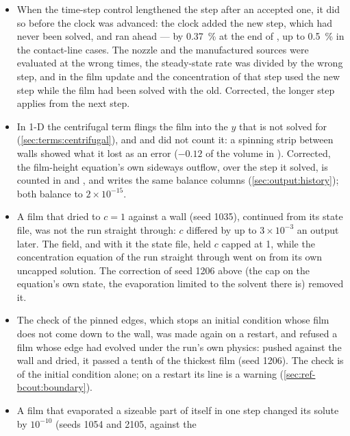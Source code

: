 \begin{itemize}
    is (\cref{sec:terms:evaporation}), the solute is kept to $10^{-13}$ and $c$
    stays at most 1.
  \item When the time-step control lengthened the step after an accepted
    one, it did so before the clock was advanced: the clock added the new
    step, which had never been solved, and ran ahead --- by
    \SI{0.37}{\percent} at the end of , up to
    \SI{0.5}{\percent} in the contact-line cases. The nozzle and the
    manufactured sources were evaluated at the wrong times, the steady-state
    rate was divided by the wrong step, and in  the film update and
    the concentration of that step used the new step while the film had been
    solved with the old. Corrected, the longer step applies from the next
    step.
  \item In 1-D the centrifugal term flings the film into the $y$ that is not
    solved for (\cref{sec:terms:centrifugal}), and  and
     did not count it: a spinning strip between walls
    showed what it lost as an error ($-0.12$ of the volume in
    ). Corrected, the film-height equation's own
    sideways outflow, over the step it solved, is counted in
     and , and  writes the
    same balance columns (\cref{sec:output:history}); both balance to
    $2\times10^{-15}$.
  \item A film that dried to $c = 1$ against a  wall (seed
    1035), continued from its state file, was not the run straight through:
    $c$ differed by up to $3\times10^{-3}$ an output later. The field, and
    with it the state file, held $c$ capped at 1, while the concentration
    equation of the run straight through went on from its own uncapped
    solution. The correction of seed 1206 above (the cap on the equation's
    own state, the evaporation limited to the solvent there is) removed it.
  \item The check of the pinned edges, which stops an initial condition whose
    film does not come down to the wall, was made again on a restart, and
    refused a film whose edge had evolved under the run's own physics:
    pushed against the wall and dried, it passed a tenth of the thickest film
    (seed 1206). The check is of the initial condition alone; on a restart
    its line is a warning (\cref{sec:ref-bcout:boundary}).
  \item A  film that evaporated a sizeable part of itself in one
    step changed its solute by $10^{-10}$ (seeds 1054 and 2105, against the

\end{itemize}

